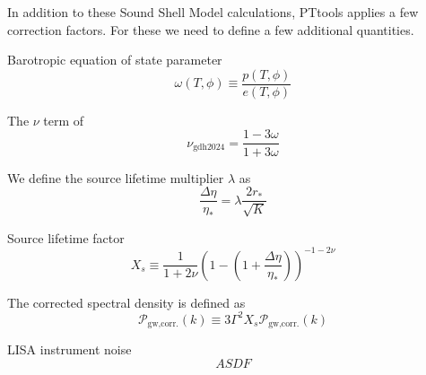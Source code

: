 \cites{hindmarsh_gw_pt_2019}[ch. 8]{lecture_notes}

In addition to these Sound Shell Model calculations, PTtools applies a few correction factors.
For these we need to define a few additional quantities.

Barotropic equation of state parameter
\begin{equation}
\omega(T,\phi) \equiv \frac{p(T,\phi)}{e(T,\phi)}
\end{equation}

The $\nu$ term of \cite[eq. 2.11]{giombi_cs_2024}
\begin{equation}
\nu_\text{gdh2024} = \frac{1 - 3\omega}{1 + 3\omega}
\end{equation}

We define the source lifetime multiplier $\lambda$ as
\begin{equation}
\frac{\Delta \eta}{\eta_*} = \lambda \frac{2 r_*}{\sqrt{K}}
\end{equation}

Source lifetime factor \cite[eq. 3.13]{giombi_cs_2024}
\begin{equation}
X_s \equiv \frac{1}{1 + 2\nu} \left(1 - \left(1 + \frac{\Delta \eta}{\eta_*} \right) \right)^{-1-2\nu}
\end{equation}

The corrected spectral density is defined as
\begin{equation}
\mathcal{P}_\text{gw,corr.}(k)
\equiv 3 \Gamma^2 X_s \mathcal{P}_\text{gw,corr.}(k)
\end{equation}


LISA instrument noise
\begin{equation}
ASDF
\end{equation}


